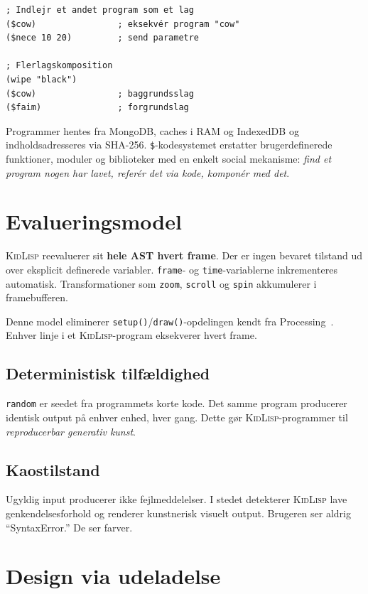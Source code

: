 \documentclass[10pt,letterpaper,twocolumn]{article}
\newcommand{\kl}{\textsc{KidLisp}}
\begin{document}
\begin{lstlisting}
; Indlejr et andet program som et lag
($cow)                ; eksekvér program "cow"
($nece 10 20)         ; send parametre

; Flerlagskomposition
(wipe "black")
($cow)                ; baggrundsslag
($faim)               ; forgrundslag
\end{lstlisting}

Programmer hentes fra MongoDB, caches i RAM og IndexedDB og indholdsadresseres via SHA-256. \texttt{\$}-kodesystemet erstatter brugerdefinerede funktioner, moduler og biblioteker med en enkelt social mekanisme: \emph{find et program nogen har lavet, referér det via kode, komponér med det}.

\section{Evalueringsmodel}

\kl{} reevaluerer sit \textbf{hele AST hvert frame}. Der er ingen bevaret tilstand ud over eksplicit definerede variabler. \texttt{frame}- og \texttt{time}-variablerne inkrementeres automatisk. Transformationer som \texttt{zoom}, \texttt{scroll} og \texttt{spin} akkumulerer i framebufferen.

Denne model eliminerer \texttt{setup()}/\texttt{draw()}-opdelingen kendt fra Processing~\citep{reas2007processing}. Enhver linje i et \kl{}-program eksekverer hvert frame.

\subsection{Deterministisk tilfældighed}

\texttt{random} er seedet fra programmets korte kode. Det samme program producerer identisk output på enhver enhed, hver gang. Dette gør \kl{}-programmer til \emph{reproducerbar generativ kunst}.

\subsection{Kaostilstand}

Ugyldig input producerer ikke fejlmeddelelser. I stedet detekterer \kl{} lave genkendelsesforhold og renderer kunstnerisk visuelt output. Brugeren ser aldrig ``SyntaxError.'' De ser farver.

\section{Design via udeladelse}
\end{document}
